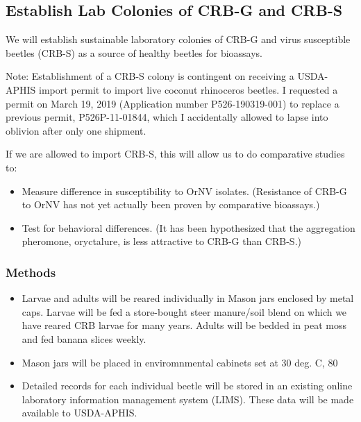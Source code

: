 \documentclass[12pt,letterpaper,english,bibliography=totocnumbered,abstract=on]{scrartcl}
\begin{document}
\newpage
\begin{framed}
\subsection{Establish Lab Colonies of CRB-G and CRB-S}

We will establish sustainable laboratory colonies of CRB-G and virus susceptible beetles (CRB-S) as a source of healthy beetles for bioassays.

Note: Establishment of a CRB-S colony is contingent on receiving a USDA-APHIS import permit to import live coconut rhinoceros beetles. I requested a permit on March 19, 2019 (Application number P526-190319-001) to replace a previous permit, P526P-11-01844, which I accidentally allowed to lapse into oblivion after only one shipment.

If we are allowed to import CRB-S, this will allow us to do comparative studies to:

\begin{itemize}
\item Measure difference in susceptibility to OrNV isolates. (Resistance of CRB-G to OrNV has not yet actually been proven by comparative bioassays.)
\item Test for behavioral differences. (It has been hypothesized that the aggregation pheromone, oryctalure, is less attractive to CRB-G than CRB-S.)
\end{itemize}

\subsubsection{Methods}

\begin{itemize}
	\item Larvae and adults will be reared individually in Mason jars enclosed by metal caps. Larvae will be fed a store-bought steer manure/soil blend on which we have reared CRB larvae for many years. Adults will be bedded in peat moss and fed banana slices weekly.
	\item Mason jars will be placed in enviromnmental cabinets set at 30 deg. C, 80%
	\item Detailed records for each individual beetle will be stored in an existing online laboratory information management system (LIMS). These data will be made available to USDA-APHIS.
\end{itemize}
\end{framed}
\end{document}
